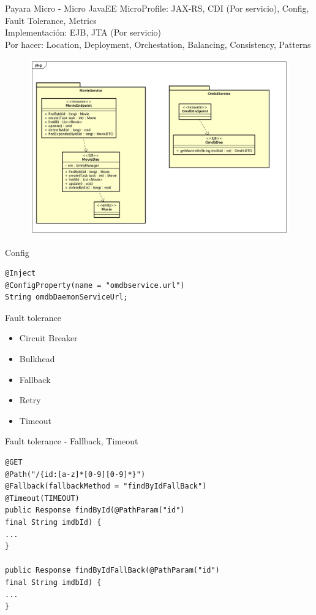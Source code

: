 \documentclass{beamer}
\begin{document}
\begin{frame}{Payara Micro - Micro JavaEE}
\footnotesize MicroProfile: JAX-RS, CDI (Por servicio), Config, Fault Tolerance, Metrics\\
Implementación: EJB, JTA (Por servicio)\\
Por hacer: Location, Deployment, Orchestation, Balancing, Consistency, Patterns
		\begin{figure}
			\centering
			\includegraphics[width=0.95\linewidth]{Images/demomicro}
		\end{figure}

\end{frame}

\begin{frame}[fragile]{Config}
\begin{lstlisting}
@Inject
@ConfigProperty(name = "omdbservice.url")
String omdbDaemonServiceUrl;
\end{lstlisting}
\end{frame}

\begin{frame}{Fault tolerance}

\begin{itemize}
	\item Circuit Breaker
	\item Bulkhead
	\item Fallback
	\item Retry
	\item Timeout
\end{itemize}

\end{frame}


\begin{frame}[fragile]{Fault tolerance - Fallback, Timeout}
\begin{lstlisting}
@GET
@Path("/{id:[a-z]*[0-9][0-9]*}")
@Fallback(fallbackMethod = "findByIdFallBack")
@Timeout(TIMEOUT)
public Response findById(@PathParam("id") 
final String imdbId) {
...
}

public Response findByIdFallBack(@PathParam("id") 
final String imdbId) {
...
}
\end{lstlisting}
\end{frame}
\end{document}
